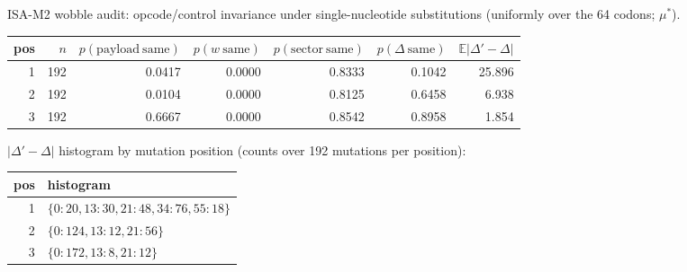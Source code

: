 ISA-M2 wobble audit: opcode/control invariance under single-nucleotide substitutions (uniformly over the 64 codons; $\mu^\ast$).

\begin{center}
\small
\setlength{\tabcolsep}{6pt}
\renewcommand{\arraystretch}{1.15}
\begin{tabular}{r r r r r r r}
\toprule
pos & $n$ & $p(\mathrm{payload\ same})$ & $p(w\ \mathrm{same})$ & $p(\mathrm{sector\ same})$ & $p(\Delta\ \mathrm{same})$ & $\mathbb{E}|\Delta' - \Delta|$ \\
\midrule
1 & 192 & 0.0417 & 0.0000 & 0.8333 & 0.1042 & 25.896 \\
2 & 192 & 0.0104 & 0.0000 & 0.8125 & 0.6458 & 6.938 \\
3 & 192 & 0.6667 & 0.0000 & 0.8542 & 0.8958 & 1.854 \\
\bottomrule
\end{tabular}
\end{center}

\noindent $|\Delta'-\Delta|$ histogram by mutation position (counts over 192 mutations per position):
\begin{center}
\scriptsize
\setlength{\tabcolsep}{6pt}
\renewcommand{\arraystretch}{1.10}
\begin{tabular}{r l}
\toprule
pos & histogram \\
\midrule
1 & $\{0:20, 13:30, 21:48, 34:76, 55:18\}$ \\
2 & $\{0:124, 13:12, 21:56\}$ \\
3 & $\{0:172, 13:8, 21:12\}$ \\
\bottomrule
\end{tabular}
\end{center}


